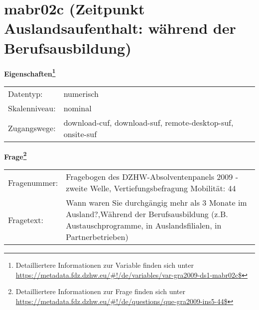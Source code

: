 
    \setcounter{footnote}{0}

    \vspace*{-1.8cm}
	\section{mabr02c (Zeitpunkt Auslandsaufenthalt: während der Berufsausbildung)}
	\label{section:mabr02c}



    \vspace*{0.5cm}
    \noindent\textbf{Eigenschaften\footnote{Detailliertere Informationen zur Variable finden sich unter
		\url{https://metadata.fdz.dzhw.eu/\#!/de/variables/var-gra2009-ds1-mabr02c$}}}\\
	\begin{tabularx}{\hsize}{@{}lX}
	Datentyp: & numerisch \\
	Skalenniveau: & nominal \\
	Zugangswege: &
	  download-cuf, 
	  download-suf, 
	  remote-desktop-suf, 
	  onsite-suf
 \\
    \end{tabularx}



				\vspace*{0.5cm}
                \noindent\textbf{Frage\footnote{Detailliertere Informationen zur Frage finden sich unter
		              \url{https://metadata.fdz.dzhw.eu/\#!/de/questions/que-gra2009-ins5-44$}}}\\
				\begin{tabularx}{\hsize}{@{}lX}
					Fragenummer: &
					  Fragebogen des DZHW-Absolventenpanels 2009 - zweite Welle, Vertiefungsbefragung Mobilität:
					  44
 \\
					Fragetext: & Wann waren Sie durchgängig mehr als 3 Monate im Ausland?,Während der Berufsausbildung (z.B. Austauschprogramme, in Auslandsfilialen, in Partnerbetrieben) \\
				\end{tabularx}





